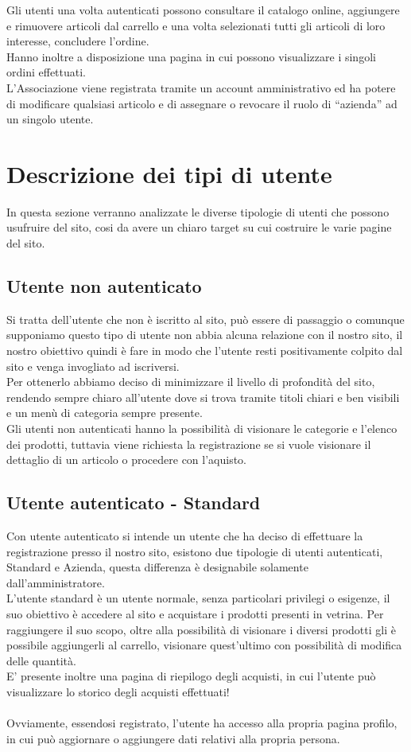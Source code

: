 Gli utenti una volta autenticati possono consultare il catalogo online, aggiungere e rimuovere articoli dal carrello e una volta selezionati tutti gli articoli di loro interesse, concludere l’ordine. \\
Hanno inoltre a disposizione una pagina in cui possono visualizzare i singoli ordini effettuati.\\

L’Associazione viene registrata tramite un account amministrativo ed ha potere di modificare qualsiasi articolo e di assegnare o revocare il ruolo di “azienda” ad un singolo utente.
\newpage
\section{Descrizione dei tipi di utente}
In questa sezione verranno analizzate le diverse tipologie di utenti che possono usufruire del sito, cosi da avere un chiaro target su cui costruire le varie pagine del sito.
\subsection{Utente non autenticato}
	Si tratta dell'utente che non è iscritto al sito, può essere di passaggio o comunque supponiamo questo tipo di utente non abbia alcuna relazione con il nostro sito, il nostro obiettivo quindi è fare in modo che l'utente resti positivamente colpito dal sito e venga invogliato ad iscriversi.\\
	Per ottenerlo abbiamo deciso di minimizzare il livello di profondità del sito, rendendo sempre chiaro all'utente dove si trova tramite titoli chiari e ben visibili e un menù di categoria sempre presente.\\
	Gli utenti non autenticati hanno la possibilità di visionare le categorie e l'elenco dei  prodotti, tuttavia viene richiesta la registrazione se si vuole visionare il dettaglio di un articolo o procedere con l'aquisto.

\subsection{Utente autenticato - Standard}
	Con utente autenticato si intende un utente che ha deciso di effettuare la registrazione presso il nostro sito, esistono due tipologie di utenti autenticati, Standard e Azienda, questa differenza è designabile solamente dall'amministratore. \\
	L'utente standard è un utente normale, senza particolari privilegi o esigenze, il suo obiettivo è accedere al sito e acquistare i prodotti presenti in vetrina. Per raggiungere il suo scopo, oltre alla possibilità di visionare i diversi prodotti gli è possibile aggiungerli al carrello, visionare quest'ultimo con possibilità di modifica delle quantità.\\
	E' presente inoltre una pagina di riepilogo degli acquisti, in cui l'utente può visualizzare lo storico degli acquisti effettuati!\\\\
	Ovviamente, essendosi registrato, l'utente ha accesso alla propria pagina profilo, in cui può aggiornare o aggiungere dati relativi alla propria persona.

